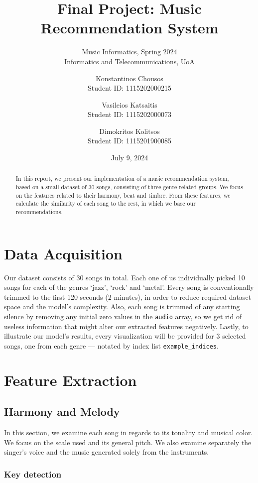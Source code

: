 \documentclass[
  letterpaper,
  twocolumn]{article}
\title{Final Project: Music Recommendation System}
\subtitle{Music Informatics, Spring
2024\\\medskip \small Informatics and Telecommunications, UoA}
\author{Konstantinos
Chousos\\\medskip \small Student ID: 1115202000215 \and Vasileios
Katsaitis\\\medskip \small Student ID: 1115202000073 \and Dimokritos
Kolitsos\\\medskip \small Student ID: 1115201900085}
\date{July 9, 2024}
\begin{document}
\maketitle

\begin{abstract}{}{}%

In this report, we present our implementation of a music recommendation
system, based on a small dataset of 30 songs, consisting of three
genre-related groups. We focus on the features related to their harmony,
beat and timbre. From these features, we calculate the similarity of
each song to the rest, in which we base our recommendations.

%
\end{abstract}

\section{Data Acquisition}\label{data-acquisition}

Our dataset consists of 30 songs in total. Each one of us individually
picked 10 songs for each of the genres `jazz', `rock' and `metal'. Every
song is conventionally trimmed to the first 120 seconds (2 minutes), in
order to reduce required dataset space and the model's complexity. Also,
each song is trimmed of any starting silence by removing any initial
zero values in the \texttt{audio} array, so we get rid of
useless information that might alter our extracted features negatively.
Lastly, to illustrate our model's results, every visualization will be
provided for 3 selected songs, one from each genre --- notated by index
list \texttt{example_indices}.

\section{Feature Extraction}\label{feature-extraction}

\subsection{Harmony and Melody}\label{harmony-and-melody}

In this section, we examine each song in regards to its tonality and
musical color. We focus on the scale used and its general pitch. We also
examine separately the singer's voice and the music generated solely
from the instruments.

\subsubsection{Key detection}\label{key-detection}
\end{document}
